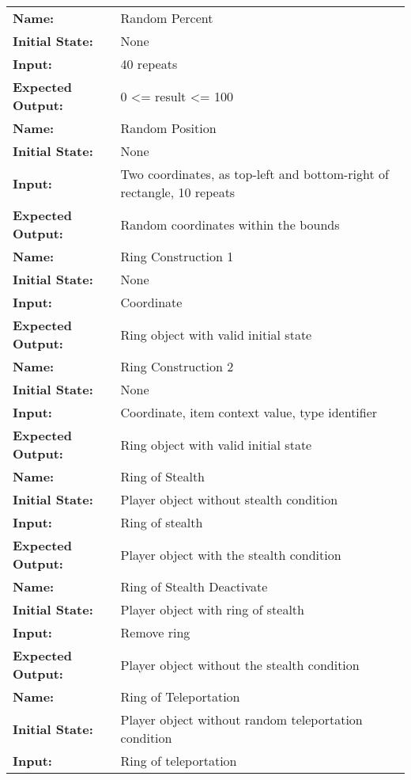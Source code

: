 \documentclass[12pt, titlepage]{article}
\begin{document}
\begin{center}
\begin{longtable}{ l | p{10cm} }
				\hline
				\textbf{Name:} & Random Percent\\
				\textbf{Initial State:} & None\\
				\textbf{Input:} & 40 repeats\\
				\textbf{Expected Output:} & 0 <= result <= 100\\
				\hline
				\textbf{Name:} & Random Position\\
				\textbf{Initial State:} & None\\
				\textbf{Input:} & Two coordinates, as top-left and bottom-right of rectangle, 10 repeats\\
				\textbf{Expected Output:} & Random coordinates within the bounds\\
				\hline
				\textbf{Name:} & Ring Construction 1\\
				\textbf{Initial State:} & None\\
				\textbf{Input:} & Coordinate\\
				\textbf{Expected Output:} & Ring object with valid initial state\\
				\hline
				\textbf{Name:} & Ring Construction 2\\
				\textbf{Initial State:} & None\\
				\textbf{Input:} & Coordinate, item context value, type identifier\\
				\textbf{Expected Output:} & Ring object with valid initial state\\
				\hline
				\textbf{Name:} & Ring of Stealth\\
				\textbf{Initial State:} & Player object without stealth condition\\
				\textbf{Input:} & Ring of stealth\\
				\textbf{Expected Output:} & Player object with the stealth condition\\
				\hline
				\textbf{Name:} & Ring of Stealth Deactivate\\
				\textbf{Initial State:} & Player object with ring of stealth\\
				\textbf{Input:} & Remove ring\\
				\textbf{Expected Output:} & Player object without the stealth condition\\
				\hline
				\textbf{Name:} & Ring of Teleportation\\
				\textbf{Initial State:} & Player object without random teleportation condition\\
				\textbf{Input:} & Ring of teleportation\\

\end{longtable}
\end{center}
\end{document}
